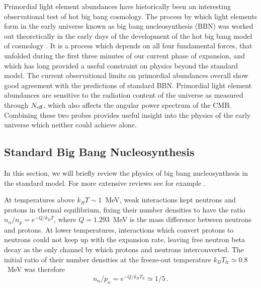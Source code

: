 Primordial light element abundances have historically been an interesting observational test of hot big bang cosmology.  The process by which light elements form in the early universe known as big bang nucleosynthesis (BBN) was worked out theoretically in the early days of the development of the hot big bang model of cosmology \cite{Alpher:1948ve}.  It is a process which depends on all four fundamental forces, that unfolded during the first three minutes of our current phase of expansion, and which has long provided a useful constraint on physics beyond the standard model.  The current observational limits on primordial abundances overall show good agreement with the predictions of standard BBN.  Primordial light element abundances are sensitive to the radiation content of the universe as measured through $N_{\rm eff}$, which also affects the angular power spectrum of the CMB.  Combining these two probes provides useful insight into the physics of the early universe which neither could achieve alone.

\subsection{Standard Big Bang Nucleosynthesis} \label{StandardBBN}
In this section, we will briefly review the physics of big bang nucleosynthesis in the standard model.  For more extensive reviews see for example \cite{Weinberg:2008zzc,Agashe:2014kda,Cyburt:2015mya}.

At temperatures above $k_BT\sim 1$~MeV, weak interactions kept neutrons and protons in thermal equilibrium, fixing their number densities to have the ratio $n_n/n_p = e^{-Q/k_BT}$, where $Q = 1.293$~MeV is the mass difference between neutrons and protons.  At lower temperatures, interactions which convert protons to neutrons could not keep up with the expansion rate, leaving free neutron beta decay as the only channel by which protons and neutrons interconverted.  The initial ratio of their number densities at the freeze-out temperature $k_BT_\mathrm{fr}\simeq0.8$~MeV was therefore
\begin{equation}
	n_n/p_n = e^{-Q/k_BT_\mathrm{fr}} \simeq 1/5 \, .
\end{equation}


